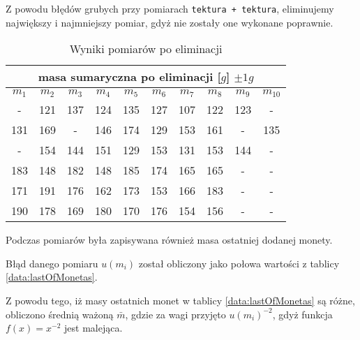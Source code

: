 \documentclass[a4paper,12pt]{article}
\begin{document}
Z powodu błędów grubych przy pomiarach \texttt{tektura + tektura}, eliminujemy największy i najmniejszy pomiar, gdyż nie zostały one wykonane poprawnie.

\begin{table}[h]
	\begin{tabular}{|c|c|c|c|c|c|c|c|c|c|}
		\hline
		\multicolumn{10}{|c|}{masa sumaryczna po eliminacji {[}$g${]} $\pm 1g$}          \\ \hline
		$m_1$ & $m_2$ & $m_3$ & $m_4$ & $m_5$ & $m_6$ & $m_7$ & $m_8$ & $m_9$ & $m_{10}$ \\ \hline\hline
		-     & 121   & 137   & 124   & 135   & 127   & 107   & 122   & 123   & -        \\ \hline
		131   & 169   & -     & 146   & 174   & 129   & 153   & 161   & -     & 135      \\ \hline
		-     & 154   & 144   & 151   & 129   & 153   & 131   & 153   & 144   & -        \\ \hline\hline
		183   & 148   & 182   & 148   & 185   & 174   & 165   & 165   & -     & -        \\ \hline
		171   & 191   & 176   & 162   & 173   & 153   & 166   & 183   & -     & -        \\ \hline
		190   & 178   & 169   & 180   & 170   & 176   & 154   & 156   & -     & -        \\ \hline
	\end{tabular}
	\centering
	\caption{Wyniki pomiarów po eliminacji}\label{data:eliminated}
\end{table}

Podczas pomiarów była zapisywana również masa ostatniej dodanej monety.


Błąd danego pomiaru $u\left( m_i \right)$ został obliczony jako połowa wartości z tablicy \ref{data:lastOfMonetas}.

Z powodu tego, iż masy ostatnich monet w tablicy \ref{data:lastOfMonetas} są różne, obliczono średnią ważoną $\bar{m}$, gdzie za wagi przyjęto ${u\left( m_i \right)}^{-2}$, gdyż funkcja $f\left(x\right) = x^{-2}$ jest malejąca.
\end{document}
